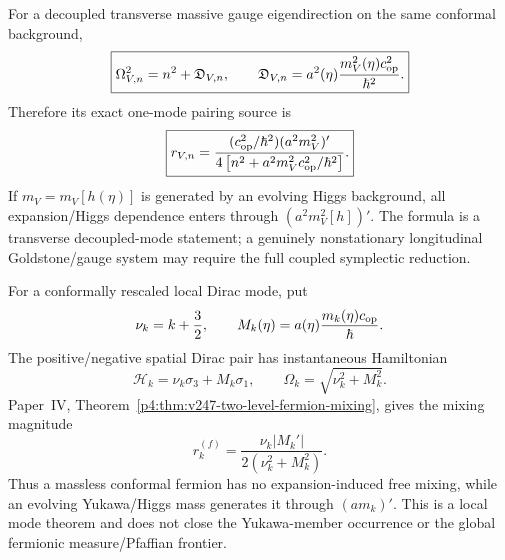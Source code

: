 \documentclass[12pt,a4paper]{article}
\begin{document}
\begin{corollary}
\label{p8:cor:v247-vector-mass-defect}
For a decoupled transverse massive gauge eigendirection on the same conformal
background,
\[
 \boxed{\Omega_{V,n}^2
 =n^2+\mathfrak D_{V,n},
 \qquad
 \mathfrak D_{V,n}
 =a^2(\eta)\frac{m_V^2(\eta)c_{\rm op}^2}{\hbar^2}.}
\]
Therefore its exact one-mode pairing source is
\[
 \boxed{r_{V,n}
 =\frac{(c_{\rm op}^2/\hbar^2)(a^2m_V^2)'}
 {4\left[n^2+a^2m_V^2c_{\rm op}^2/\hbar^2\right]}.}
\]
If \(m_V=m_V[h(\eta)]\) is generated by an evolving Higgs background, all
expansion/Higgs dependence enters through \((a^2m_V^2[h])'\).  The formula is
a transverse decoupled-mode statement; a genuinely nonstationary longitudinal
Goldstone/gauge system may require the full coupled symplectic reduction.
\end{corollary}

\begin{corollary}
\label{p8:cor:v247-fermion-mass-mixing}
For a conformally rescaled local Dirac mode, put
\[
 \nu_k=k+\frac32,
 \qquad
 M_k(\eta)=a(\eta)\frac{m_k(\eta)c_{\rm op}}{\hbar}.
\]
The positive/negative spatial Dirac pair has instantaneous Hamiltonian
\[
 \mathcal H_k=\nu_k\sigma_3+M_k\sigma_1,
 \qquad
 \Omega_k=\sqrt{\nu_k^2+M_k^2}.
\]
Paper~IV, Theorem~\ref{p4:thm:v247-two-level-fermion-mixing}, gives the
mixing magnitude
\[
 \boxed{r_k^{(f)}
 =\frac{\nu_k|M_k'|}{2(\nu_k^2+M_k^2)}.}
\]
Thus a massless conformal fermion has no expansion-induced free mixing, while
an evolving Yukawa/Higgs mass generates it through \((a m_k)'\).  This is a
local mode theorem and does not close the Yukawa-member occurrence or the
global fermionic measure/Pfaffian frontier.
\end{corollary}
\end{document}

